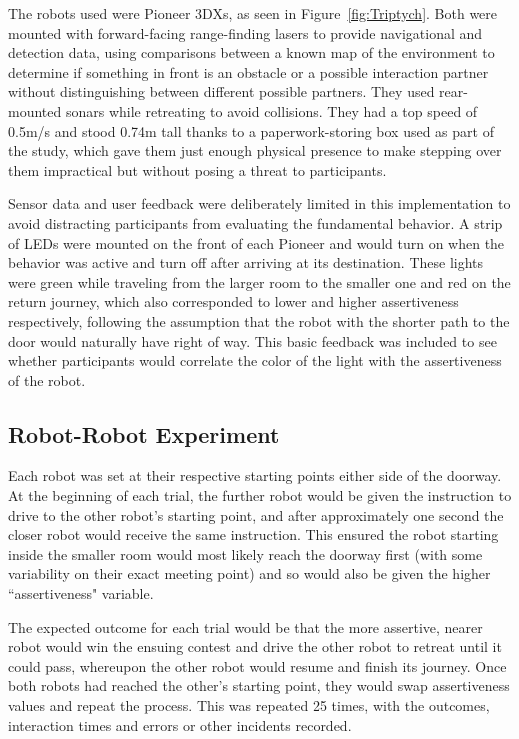 \documentclass[letterpaper, 10 pt, conference]{ieeeconf}  %
\begin{document}
The robots used were Pioneer 3DXs, as seen in Figure~\ref{fig:Triptych}. Both were mounted with forward-facing range-finding lasers to provide navigational and detection data, using comparisons between a known map of the environment to determine if something in front is an obstacle or a possible interaction partner without distinguishing between different possible partners. They used rear-mounted sonars while retreating to avoid collisions. They had a top speed of 0.5m/s and stood 0.74m tall thanks to a paperwork-storing box used as part of the study, which gave them just enough physical presence to make stepping over them impractical but without posing a threat to participants.

Sensor data and user feedback were deliberately limited in this implementation to avoid distracting participants from evaluating the fundamental behavior. A strip of LEDs were mounted on the front of each Pioneer and would turn on when the behavior was active and turn off after arriving at its destination. These lights were green while traveling from the larger room to the smaller one and red on the return journey, which also corresponded to lower and higher assertiveness respectively, following the assumption that the robot with the shorter path to the door would naturally have right of way. This basic feedback was included to see whether participants would correlate the color of the light with the assertiveness of the robot.


\subsection{Robot-Robot Experiment}

Each robot was set at their respective starting points either side of the doorway. At the beginning of each trial, the further robot would be given the instruction to drive to the other robot’s starting point, and after approximately one second the closer robot would receive the same instruction. This ensured the robot starting inside the smaller room would most likely reach the doorway first (with some variability on their exact meeting point) and so would also be given the higher ``assertiveness" variable.

The expected outcome for each trial would be that the more assertive, nearer robot would win the ensuing contest and drive the other robot to retreat until it could pass, whereupon the other robot would resume and finish its journey. Once both robots had reached the other’s starting point, they would swap assertiveness values and repeat the process. This was repeated 25 times, with the outcomes, interaction times and errors or other incidents recorded. 
\end{document}
